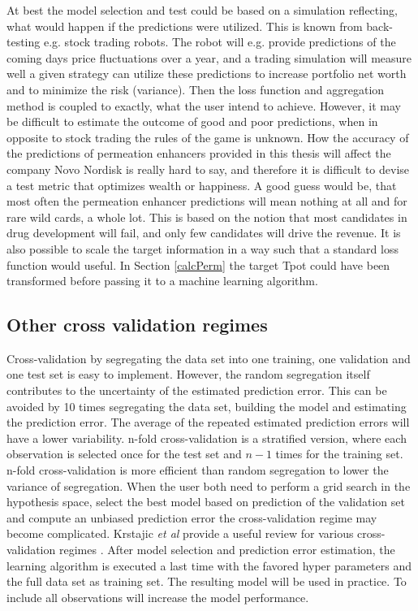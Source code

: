 At best the model selection and test could be based on a simulation reflecting, what would happen if the predictions were utilized. This is known from back-testing e.g. stock trading robots. The robot will e.g. provide predictions of the coming days price fluctuations over a year, and a trading simulation will measure well a given strategy can utilize these predictions to increase portfolio net worth and to minimize the risk (variance). Then the loss function and aggregation method is coupled to exactly, what the user intend to achieve. However, it may be difficult to estimate the outcome of good and poor predictions, when in opposite to stock trading the rules of the game is unknown. How the accuracy of the predictions of permeation enhancers provided in this thesis will affect the company Novo Nordisk is really hard to say, and therefore it is difficult to devise a test metric that optimizes wealth or happiness. A good guess would be, that most often the permeation enhancer predictions will mean nothing at all and for rare wild cards, a whole lot. This is based on the notion that most candidates in drug development will fail, and only few candidates will drive the revenue. It is also possible to scale the target information in a way such that a standard loss function would useful. In Section \ref{calcPerm} the target Tpot could have been transformed before passing it to a machine learning algorithm. 

\subsection{Other cross validation regimes}
Cross-validation by segregating the data set into one training, one validation and one test set is easy to implement. However, the random segregation itself contributes to the uncertainty of the estimated prediction error. This can be avoided by 10 times segregating the data set, building the model and estimating the prediction error. The average of the repeated estimated prediction errors will have a lower variability. n-fold cross-validation is a stratified version, where each observation is selected once for the test set and $n-1$ times for the training set. n-fold cross-validation is more efficient than random segregation to lower the variance of segregation. When the user both need to perform a grid search in the hypothesis space, select the best model based on prediction of the validation set and compute an unbiased  prediction error the cross-validation regime may become complicated. Krstajic \textit{et al} provide a useful review for various cross-validation regimes \cite{krstajic2014cross}. After model selection and prediction error estimation, the learning algorithm is executed a last time with the favored hyper parameters and the full data set as training set. The resulting model will be used in practice. To include all observations will increase the model performance.

